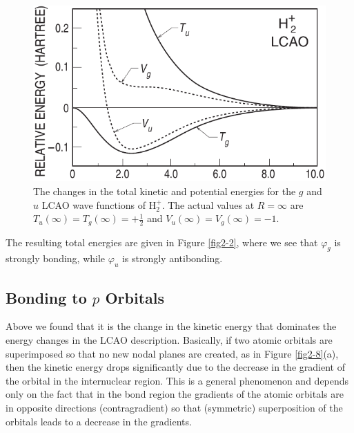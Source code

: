 \begin{figure}
\includegraphics[scale=0.75]{fig2-07}
\caption{The changes in the total kinetic and potential energies for
  the $g$ and $u$ LCAO wave functions of H$_2^+$. The actual values at
  $R=\infty$ are $T_u(\infty)=T_g(\infty)=+\frac{1}{2}$ and
  $V_u(\infty)=V_g(\infty)=-1$.} 
\label{fig2-7}
\end{figure}

The resulting total energies are given in Figure
\ref{fig2-2}, where we see that $\varphi_g$ is strongly bonding, while
$\varphi_u$ is strongly antibonding.

\subsection{Bonding to $p$ Orbitals}

Above we found that it is the change in the kinetic energy that
dominates the energy changes in the LCAO description. Basically, if
two atomic orbitals are superimposed so that no new nodal planes are
created, as in Figure \ref{fig2-8}(a), then the kinetic energy drops
significantly due to the decrease in the gradient of the orbital in
the internuclear region. This is a general phenomenon and depends only
on the fact that in the bond region the gradients of the atomic
orbitals are in opposite directions (contragradient) so that 
(symmetric) superposition of the orbitals leads to a decrease in the
gradients.

